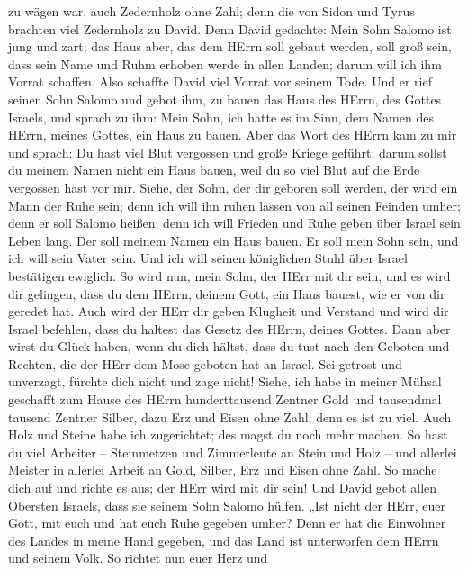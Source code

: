 zu wägen war,  auch Zedernholz ohne Zahl; denn die von Sidon
und Tyrus brachten viel Zedernholz zu David.  Denn David
gedachte: Mein Sohn Salomo ist jung und zart; das Haus aber, das dem
HErrn soll gebaut werden, soll groß sein, dass sein Name und Ruhm
erhoben werde in allen Landen; darum will ich ihm Vorrat schaffen. Also
schaffte David viel Vorrat vor seinem Tode.  Und er rief
seinen Sohn Salomo und gebot ihm, zu bauen das Haus des HErrn, des
Gottes Israels,  und sprach zu ihm: Mein Sohn, ich hatte es
im Sinn, dem Namen des HErrn, meines Gottes, ein Haus zu bauen.
 Aber das Wort des HErrn kam zu mir und sprach: Du hast viel
Blut vergossen und große Kriege geführt; darum sollst du meinem Namen
nicht ein Haus bauen, weil du so viel Blut auf die Erde vergossen hast
vor mir.  Siehe, der Sohn, der dir geboren soll werden, der
wird ein Mann der Ruhe sein; denn ich will ihn ruhen lassen von all
seinen Feinden umher; denn er soll Salomo heißen; denn ich will Frieden
und Ruhe geben über Israel sein Leben lang.  Der soll
meinem Namen ein Haus bauen. Er soll mein Sohn sein, und ich will sein
Vater sein. Und ich will seinen königlichen Stuhl über Israel bestätigen
ewiglich.  So wird nun, mein Sohn, der HErr mit dir sein,
und es wird dir gelingen, dass du dem HErrn, deinem Gott, ein Haus
bauest, wie er von dir geredet hat.  Auch wird der HErr dir
geben Klugheit und Verstand und wird dir Israel befehlen, dass du
haltest das Gesetz des HErrn, deines Gottes.  Dann aber
wirst du Glück haben, wenn du dich hältst, dass du tust nach den Geboten
und Rechten, die der HErr dem Mose geboten hat an Israel. Sei getrost
und unverzagt, fürchte dich nicht und zage nicht!  Siehe,
ich habe in meiner Mühsal geschafft zum Hause des HErrn hunderttausend
Zentner Gold und tausendmal tausend Zentner Silber, dazu Erz und Eisen
ohne Zahl; denn es ist zu viel. Auch Holz und Steine habe ich
zugerichtet; des magst du noch mehr machen.  So hast du
viel Arbeiter -- Steinmetzen und Zimmerleute an Stein und Holz -- und
allerlei Meister in allerlei Arbeit  an Gold, Silber, Erz
und Eisen ohne Zahl. So mache dich auf und richte es aus; der HErr wird
mit dir sein!  Und David gebot allen Obersten Israels, dass
sie seinem Sohn Salomo hülfen.  „Ist nicht der HErr, euer
Gott, mit euch und hat euch Ruhe gegeben umher? Denn er hat die
Einwohner des Landes in meine Hand gegeben, und das Land ist unterworfen
dem HErrn und seinem Volk.  So richtet nun euer Herz und
